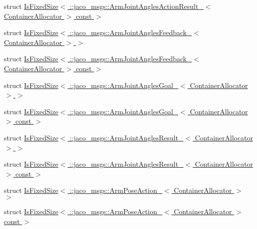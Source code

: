 \begin{DoxyCompactItemize}
\item 
struct \hyperlink{structros_1_1message__traits_1_1IsFixedSize_3_01_1_1jaco__msgs_1_1ArmJointAnglesActionResult___3bf1df1374d517dec039dc4942b1afdab}{Is\+Fixed\+Size$<$ \+::jaco\+\_\+msgs\+::\+Arm\+Joint\+Angles\+Action\+Result\+\_\+$<$ Container\+Allocator $>$ const  $>$}
\item 
struct \hyperlink{structros_1_1message__traits_1_1IsFixedSize_3_01_1_1jaco__msgs_1_1ArmJointAnglesFeedback___3_01ContainerAllocator_01_4_01_4}{Is\+Fixed\+Size$<$ \+::jaco\+\_\+msgs\+::\+Arm\+Joint\+Angles\+Feedback\+\_\+$<$ Container\+Allocator $>$ $>$}
\item 
struct \hyperlink{structros_1_1message__traits_1_1IsFixedSize_3_01_1_1jaco__msgs_1_1ArmJointAnglesFeedback___3_01C3f571e8084471b8c76113de3d2ed996b}{Is\+Fixed\+Size$<$ \+::jaco\+\_\+msgs\+::\+Arm\+Joint\+Angles\+Feedback\+\_\+$<$ Container\+Allocator $>$ const  $>$}
\item 
struct \hyperlink{structros_1_1message__traits_1_1IsFixedSize_3_01_1_1jaco__msgs_1_1ArmJointAnglesGoal___3_01ContainerAllocator_01_4_01_4}{Is\+Fixed\+Size$<$ \+::jaco\+\_\+msgs\+::\+Arm\+Joint\+Angles\+Goal\+\_\+$<$ Container\+Allocator $>$ $>$}
\item 
struct \hyperlink{structros_1_1message__traits_1_1IsFixedSize_3_01_1_1jaco__msgs_1_1ArmJointAnglesGoal___3_01Contaf87d10cae82c072c931f87ba5ed05ab6}{Is\+Fixed\+Size$<$ \+::jaco\+\_\+msgs\+::\+Arm\+Joint\+Angles\+Goal\+\_\+$<$ Container\+Allocator $>$ const  $>$}
\item 
struct \hyperlink{structros_1_1message__traits_1_1IsFixedSize_3_01_1_1jaco__msgs_1_1ArmJointAnglesResult___3_01ContainerAllocator_01_4_01_4}{Is\+Fixed\+Size$<$ \+::jaco\+\_\+msgs\+::\+Arm\+Joint\+Angles\+Result\+\_\+$<$ Container\+Allocator $>$ $>$}
\item 
struct \hyperlink{structros_1_1message__traits_1_1IsFixedSize_3_01_1_1jaco__msgs_1_1ArmJointAnglesResult___3_01Con1546e909e7321b3a809ed15201acdb39}{Is\+Fixed\+Size$<$ \+::jaco\+\_\+msgs\+::\+Arm\+Joint\+Angles\+Result\+\_\+$<$ Container\+Allocator $>$ const  $>$}
\item 
struct \hyperlink{structros_1_1message__traits_1_1IsFixedSize_3_01_1_1jaco__msgs_1_1ArmPoseAction___3_01ContainerAllocator_01_4_01_4}{Is\+Fixed\+Size$<$ \+::jaco\+\_\+msgs\+::\+Arm\+Pose\+Action\+\_\+$<$ Container\+Allocator $>$ $>$}
\item 
struct \hyperlink{structros_1_1message__traits_1_1IsFixedSize_3_01_1_1jaco__msgs_1_1ArmPoseAction___3_01ContainerAllocator_01_4_01const_01_01_4}{Is\+Fixed\+Size$<$ \+::jaco\+\_\+msgs\+::\+Arm\+Pose\+Action\+\_\+$<$ Container\+Allocator $>$ const  $>$}

\end{DoxyCompactItemize}
